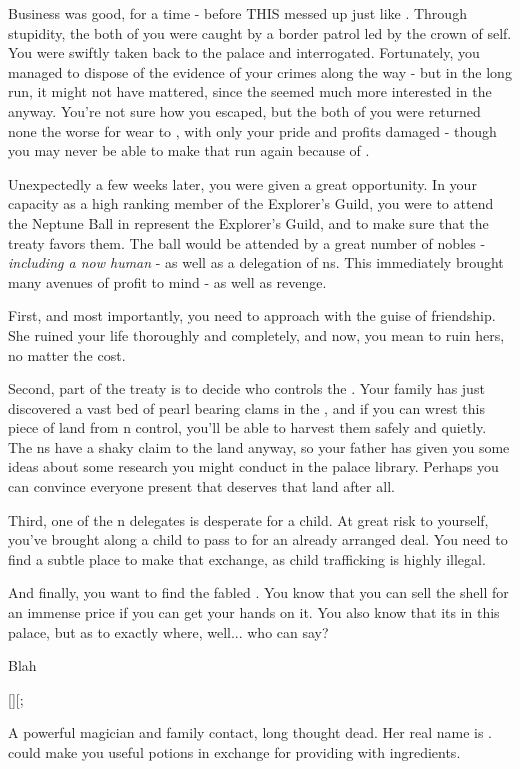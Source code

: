 \documentclass[char]{NeptuneBall}
\begin{document}
Business was good, for a time - before THIS \cPrincess{\prince} messed up just like \cPrincess{\their} \cAriel{\sibling}. Through \cPrincess{\their} stupidity, the both of you were caught by a border patrol led by the crown \cPrince{\Prince} of \pPacifica{} \cPrince{\them}self. You were swiftly taken back to the palace and interrogated. Fortunately, you managed to dispose of the evidence of your crimes along the way - but in the long run, it might not have mattered, since the \cPrince{\prince} seemed much more interested in the \cPrincess{\prince} anyway. You're not sure how you escaped, but the both of you were returned none the worse for wear to \pAtlantis{}, with only your pride and profits damaged - though you may never be able to make that run again because of \emph{\cPrincess{\them}}.
 
Unexpectedly a few weeks later, you were given a great opportunity. In your capacity as a high ranking member of the Explorer's Guild, you were to attend the Neptune Ball in represent the Explorer's Guild, and to make sure that the treaty favors them. The ball would be attended by a great number of nobles - \emph{including a now human \cAriel{}} - as well as a delegation of \pPacifica{}ns. This immediately brought many avenues of profit to mind - as well as revenge.

First, and most importantly, you need to approach \cAriel{} with the guise of friendship. She ruined your life thoroughly and completely, and now, you mean to ruin hers, no matter the cost.

Second, part of the treaty is to decide who controls the \pGazaStrip{}. Your family has just discovered a vast bed of pearl bearing clams in the \ptrench{}, and if you can wrest this piece of land from \pPacifica{}n control, you'll be able to harvest them safely and quietly. The \pPacifica{}ns have a shaky claim to the land anyway, so your father has given you some ideas about some research you might conduct in the palace library. Perhaps you can convince everyone present that \pAtlantis{} deserves that land after all.

Third, one of the \pPacifica{}n delegates is desperate for a child. At great risk to yourself, you've brought along a child to pass to \cBodyguard{\them} for an already arranged deal. You need to find a subtle place to make that exchange, as child trafficking is highly illegal.

And finally, you want to find the fabled \iGlowShell{\MYname}. You know that you can sell the shell for an immense price if you can get your hands on it. You also know that its in this palace, but as to exactly where, well... who can say?

\begin{itemz}[Goals]
  \item Blah
\end{itemz}
[][;
\begin{contacts}
  \contact{\cWitch{\MYname}} A powerful magician and family contact, long thought dead. Her real name is \cWitch{}. \cWitch{\They} could make you useful potions in exchange for providing \cWitch{\them} with ingredients.
\end{contacts}
\end{document}
